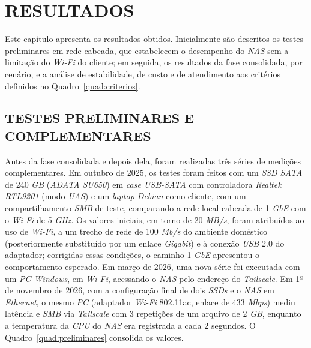 
\chapter{RESULTADOS}
\label{cap:resultados}

Este capítulo apresenta os resultados obtidos. Inicialmente são descritos os testes preliminares em rede cabeada, que estabelecem o desempenho do \textit{NAS} sem a limitação do \textit{Wi-Fi} do cliente; em seguida, os resultados da fase consolidada, por cenário, e a análise de estabilidade, de custo e de atendimento aos critérios definidos no Quadro~\ref{quad:criterios}.

\section{TESTES PRELIMINARES E COMPLEMENTARES}

Antes da fase consolidada e depois dela, foram realizadas três séries de medições complementares. Em outubro de 2025, os testes foram feitos com um \textit{SSD SATA} de 240 \textit{GB} (\textit{ADATA SU650}) em \textit{case USB-SATA} com controladora \textit{Realtek RTL9201} (modo \textit{UAS}) e um \textit{laptop Debian} como cliente, com um compartilhamento \textit{SMB} de teste, comparando a rede local cabeada de 1 \textit{GbE} com o \textit{Wi-Fi} de 5 \textit{GHz}. Os valores iniciais, em torno de 20 \textit{MB/s}, foram atribuídos ao uso de \textit{Wi-Fi}, a um trecho de rede de 100 \textit{Mb/s} do ambiente doméstico (posteriormente substituído por um enlace \textit{Gigabit}) e à conexão \textit{USB} 2.0 do adaptador; corrigidas essas condições, o caminho 1 \textit{GbE} apresentou o comportamento esperado. Em março de 2026, uma nova série foi executada com um \textit{PC Windows}, em \textit{Wi-Fi}, acessando o \textit{NAS} pelo endereço do \textit{Tailscale}. Em 1º de novembro de 2026, com a configuração final de dois \textit{SSDs} e o \textit{NAS} em \textit{Ethernet}, o mesmo \textit{PC} (adaptador \textit{Wi-Fi} 802.11ac, enlace de 433 \textit{Mbps}) mediu latência e \textit{SMB} via \textit{Tailscale} com 3 repetições de um arquivo de 2 \textit{GB}, enquanto a temperatura da \textit{CPU} do \textit{NAS} era registrada a cada 2 segundos. O Quadro~\ref{quad:preliminares} consolida os valores.


